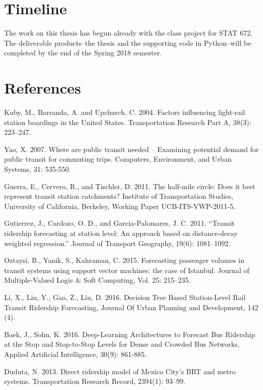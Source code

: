 \documentclass{article}
\begin{document}
\section{Timeline}

The work on this thesis has begun already with the class project for STAT 672. The deliverable products--the thesis and the supporting code in Python--will be completed by the end of the Spring 2018 semester. 

\section{References}


Kuby, M., Barranda, A. and Upchurch, C. 2004. Factors influencing light-rail station boardings in the United States. Transportation Research Part A, 38(3): 223–247.

Yao, X. 2007. Where are public transit needed -- Examining potential demand for public transit for commuting trips. Computers, Environment, and Urban Systems, 31: 535-550.

Guerra, E., Cervero, R., and Tischler, D. 2011. The half-mile circle: Does it best represent transit station catchments? Institute of Transportation Studies, University of California, Berkeley, Working Paper UCB-ITS-VWP-2011-5.

Gutierrez, J., Cardozo, O. D., and Garcia-Palomares, J. C. 2011. “Transit ridership forecasting at station level: An approach based on distance-decay weighted regression.” Journal of Transport Geography, 19(6): 1081–1092.

Oztaysi, B., Yanik, S.,  Kahraman, C. 2015. Forecasting passenger volumes in transit systems using support vector machines: the case of Istanbul. Journal of Multiple-Valued Logic \& Soft Computing, Vol. 25: 215–235.

Li, X., Liu, Y., Gao, Z., Liu, D. 2016. Decision Tree Based Station-Level Rail Transit Ridership Forecasting, Journal Of Urban Planning and Development, 142 (4).

Baek, J., Sohn, K. 2016. Deep-Learning Architectures to Forecast Bus Ridership at the Stop and Stop-to-Stop Levels for Dense and Crowded Bus Networks, Applied Artificial Intelligence, 30(9): 861-885.

Duduta, N. 2013. Direct ridership model of Mexico City’s BRT and metro systems. Transportation Research Record, 2394(1): 93–99.
\end{document}
